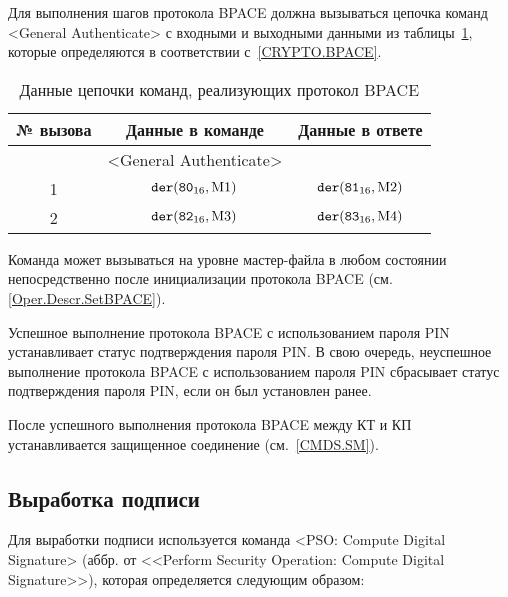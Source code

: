 Для выполнения шагов протокола BPACE должна вызываться цепочка 
команд <General Authenticate> с входными и выходными данными 
из таблицы~\ref{Table.Oper.BPACE}, 
которые определяются в соответствии с~\ref{CRYPTO.BPACE}. 

\begin{table}[h]
\caption{Данные цепочки команд, реализующих протокол BPACE}
\label{Table.Oper.BPACE}
\begin{tabular}{|c|c|c|}
\hline
№ вызова & Данные в команде & Данные в ответе\\
\hline
\hline
 & <General Authenticate> &  \\
\hline
\hline
1 & $\texttt{der}(\texttt{80}_{16}, \text{M1})$ & 
$\texttt{der}(\texttt{81}_{16}, \text{M2})$\\
\hline
2 & $\texttt{der}(\texttt{82}_{16}, \text{M3})$ & 
$\texttt{der}(\texttt{83}_{16}, \text{M4})$\\
\hline
\end{tabular}
\end{table}

Команда может вызываться на уровне мастер-файла в любом состоянии
непосредственно после инициализации протокола 
BPACE (см. \ref{Oper.Descr.SetBPACE}).

Успешное выполнение протокола BPACE с использованием пароля PIN 
устанавливает статус подтверждения пароля PIN.
В свою очередь, неуспешное выполнение протокола BPACE с использованием 
пароля PIN сбрасывает статус подтверждения пароля PIN, 
если он был установлен ранее.

После успешного выполнения протокола BPACE между КТ и КП 
устанавливается защищенное соединение (см.~\ref{CMDS.SM}).

\subsection{Выработка подписи}
\label{Oper.Descr.Signature}

Для выработки подписи используется 
команда <PSO: Compute Digital Signature>
(аббр. от <<Perform Security Operation: Compute Digital Signature>>),
которая определяется следующим образом:


